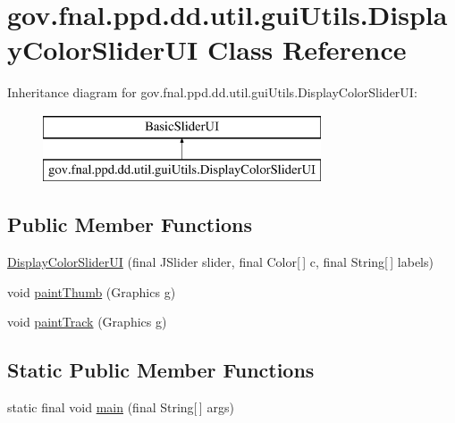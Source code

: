 \hypertarget{classgov_1_1fnal_1_1ppd_1_1dd_1_1util_1_1guiUtils_1_1DisplayColorSliderUI}{\section{gov.\-fnal.\-ppd.\-dd.\-util.\-gui\-Utils.\-Display\-Color\-Slider\-U\-I Class Reference}
\label{classgov_1_1fnal_1_1ppd_1_1dd_1_1util_1_1guiUtils_1_1DisplayColorSliderUI}
}
Inheritance diagram for gov.\-fnal.\-ppd.\-dd.\-util.\-gui\-Utils.\-Display\-Color\-Slider\-U\-I\-:\begin{figure}[H]
\begin{center}
\leavevmode
\includegraphics[height=2.000000cm]{classgov_1_1fnal_1_1ppd_1_1dd_1_1util_1_1guiUtils_1_1DisplayColorSliderUI}
\end{center}
\end{figure}
\subsection*{Public Member Functions}
\begin{DoxyCompactItemize}
\item 
\hyperlink{classgov_1_1fnal_1_1ppd_1_1dd_1_1util_1_1guiUtils_1_1DisplayColorSliderUI_a450ac978df6b89aaac352c20d5deb32e}{Display\-Color\-Slider\-U\-I} (final J\-Slider slider, final Color\mbox{[}$\,$\mbox{]} c, final String\mbox{[}$\,$\mbox{]} labels)
\item 
void \hyperlink{classgov_1_1fnal_1_1ppd_1_1dd_1_1util_1_1guiUtils_1_1DisplayColorSliderUI_a4511f015e848a3c0fc9559d293d35243}{paint\-Thumb} (Graphics g)
\item 
void \hyperlink{classgov_1_1fnal_1_1ppd_1_1dd_1_1util_1_1guiUtils_1_1DisplayColorSliderUI_abcaf76f68e648a8b4b79f37014ab628a}{paint\-Track} (Graphics g)
\end{DoxyCompactItemize}
\subsection*{Static Public Member Functions}
\begin{DoxyCompactItemize}
\item 
static final void \hyperlink{classgov_1_1fnal_1_1ppd_1_1dd_1_1util_1_1guiUtils_1_1DisplayColorSliderUI_a9d0edb601c89b23e03e344e810235636}{main} (final String\mbox{[}$\,$\mbox{]} args)
\end{DoxyCompactItemize}
